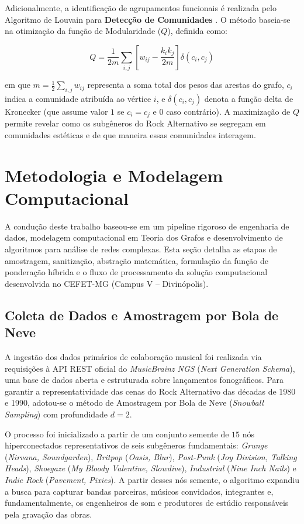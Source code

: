 \documentclass[conference]{IEEEtran}
\begin{document}
Adicionalmente, a identificação de agrupamentos funcionais é realizada pelo Algoritmo de Louvain para \textbf{Detecção de Comunidades} \cite{blondel2008}. O método baseia-se na otimização da função de Modularidade ($Q$), definida como:

\begin{equation}
Q = \frac{1}{2m} \sum_{i,j} \left[ w_{ij} - \frac{k_i k_j}{2m} \right] \delta(c_i, c_j)
\end{equation}

em que $m = \frac{1}{2}\sum_{i,j} w_{ij}$ representa a soma total dos pesos das arestas do grafo, $c_i$ indica a comunidade atribuída ao vértice $i$, e $\delta(c_i, c_j)$ denota a função delta de Kronecker (que assume valor $1$ se $c_i = c_j$ e $0$ caso contrário). A maximização de $Q$ permite revelar como os subgêneros do Rock Alternativo se segregam em comunidades estéticas e de que maneira essas comunidades interagem.

\section{Metodologia e Modelagem Computacional}

A condução deste trabalho baseou-se em um pipeline rigoroso de engenharia de dados, modelagem computacional em Teoria dos Grafos e desenvolvimento de algoritmos para análise de redes complexas. Esta seção detalha as etapas de amostragem, sanitização, abstração matemática, formulação da função de ponderação híbrida e o fluxo de processamento da solução computacional desenvolvida no CEFET-MG (Campus V -- Divinópolis).

\subsection{Coleta de Dados e Amostragem por Bola de Neve}
A ingestão dos dados primários de colaboração musical foi realizada via requisições à API REST oficial do \textit{MusicBrainz NGS} (\textit{Next Generation Schema}), uma base de dados aberta e estruturada sobre lançamentos fonográficos. Para garantir a representatividade das cenas do Rock Alternativo das décadas de 1980 e 1990, adotou-se o método de Amostragem por Bola de Neve (\textit{Snowball Sampling}) com profundidade $d=2$.

O processo foi inicializado a partir de um conjunto semente de $15$ nós hiperconectados representativos de seis subgêneros fundamentais: \textit{Grunge} (\textit{Nirvana, Soundgarden}), \textit{Britpop} (\textit{Oasis, Blur}), \textit{Post-Punk} (\textit{Joy Division, Talking Heads}), \textit{Shoegaze} (\textit{My Bloody Valentine, Slowdive}), \textit{Industrial} (\textit{Nine Inch Nails}) e \textit{Indie Rock} (\textit{Pavement, Pixies}). A partir desses nós semente, o algoritmo expandiu a busca para capturar bandas parceiras, músicos convidados, integrantes e, fundamentalmente, os engenheiros de som e produtores de estúdio responsáveis pela gravação das obras.
\end{document}

